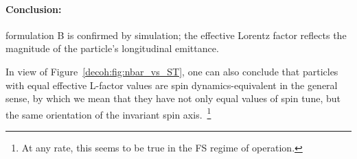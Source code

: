 \paragraph{Conclusion:} formulation B is confirmed by simulation; the effective Lorentz factor reflects the
magnitude of the particle's longitudinal emittance.

In view of Figure~\ref{decoh:fig:nbar_vs_ST}, one can also conclude that particles with equal
effective L-factor values are spin dynamics-equivalent in the general sense, by which we mean that
they have not only equal values of spin tune, but the same orientation of the invariant spin axis.~\footnote{
At any rate, this seems to be true in the FS regime of operation.}
